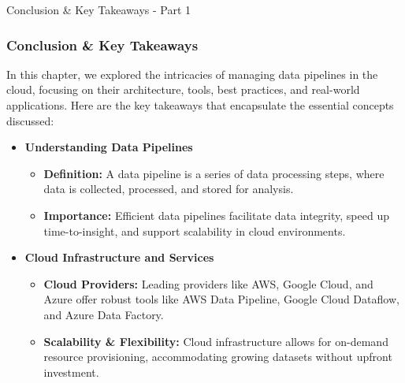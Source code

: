 \documentclass[aspectratio=169]{beamer}
\begin{document}
\begin{frame}[fragile]{Conclusion \& Key Takeaways - Part 1}
  \frametitle{Conclusion \& Key Takeaways}
  In this chapter, we explored the intricacies of managing data pipelines in the cloud, focusing on their architecture, tools, best practices, and real-world applications. Here are the key takeaways that encapsulate the essential concepts discussed:  
  \begin{itemize}
      \item \textbf{Understanding Data Pipelines}
        \begin{itemize}
            \item \textbf{Definition:} A data pipeline is a series of data processing steps, where data is collected, processed, and stored for analysis.
            \item \textbf{Importance:} Efficient data pipelines facilitate data integrity, speed up time-to-insight, and support scalability in cloud environments.
        \end{itemize}
      \item \textbf{Cloud Infrastructure and Services}
        \begin{itemize}
            \item \textbf{Cloud Providers:} Leading providers like AWS, Google Cloud, and Azure offer robust tools like AWS Data Pipeline, Google Cloud Dataflow, and Azure Data Factory.
            \item \textbf{Scalability \& Flexibility:} Cloud infrastructure allows for on-demand resource provisioning, accommodating growing datasets without upfront investment.
        \end{itemize}
  \end{itemize}
\end{frame}
\end{document}
